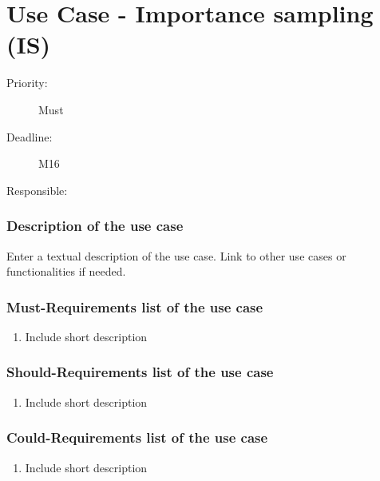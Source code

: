 \newpage
\section{Use Case - Importance sampling (IS)}
\label{UseCase:IS}

\begin{description}
\item[Priority:] Must
\item[Deadline:] M16
\item[Responsible:]
\end{description}

\subsubsection*{Description of the use case}

Enter a textual description of the use case. Link to other use cases or functionalities if needed. 


\subsubsection*{Must-Requirements list of the use case}

\begin{enumerate}
\item Include short description
\end{enumerate}

\subsubsection*{Should-Requirements list of the use case}

\begin{enumerate}
\item Include short description
\end{enumerate}

\subsubsection*{Could-Requirements list of the use case}

\begin{enumerate}
\item Include short description
\end{enumerate}